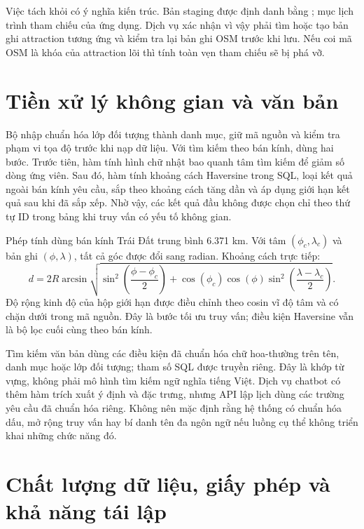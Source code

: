 Việc tách  khỏi  có ý nghĩa kiến trúc. Bản staging được định danh bằng ; mục lịch trình tham chiếu  của ứng dụng. Dịch vụ xác nhận vì vậy phải tìm hoặc tạo bản ghi attraction tương ứng và kiểm tra lại bản ghi OSM trước khi lưu. Nếu coi mã OSM là khóa của attraction lõi thì tính toàn vẹn tham chiếu sẽ bị phá vỡ.

\section{Tiền xử lý không gian và văn bản}

Bộ nhập chuẩn hóa lớp đối tượng thành danh mục, giữ mã nguồn và kiểm tra phạm vi tọa độ trước khi nạp dữ liệu. Với tìm kiếm theo bán kính,  dùng hai bước. Trước tiên, hàm tính hình chữ nhật bao quanh tâm tìm kiếm để giảm số dòng ứng viên. Sau đó, hàm tính khoảng cách Haversine trong SQL, loại kết quả ngoài bán kính yêu cầu, sắp theo khoảng cách tăng dần và áp dụng giới hạn kết quả sau khi đã sắp xếp. Nhờ vậy, các kết quả đầu không được chọn chỉ theo thứ tự ID trong bảng khi truy vấn có yếu tố không gian.

Phép tính dùng bán kính Trái Đất trung bình 6.371 km. Với tâm $(\phi_c,\lambda_c)$ và bản ghi $(\phi,\lambda)$, tất cả góc được đổi sang radian. Khoảng cách trực tiếp:
\begin{equation}
    d = 2R\arcsin\sqrt{
        \sin^2\left(\frac{\phi-\phi_c}{2}\right)
        + \cos(\phi_c)\cos(\phi)
          \sin^2\left(\frac{\lambda-\lambda_c}{2}\right)}.
\end{equation}
Độ rộng kinh độ của hộp giới hạn được điều chỉnh theo cosin vĩ độ tâm và có chặn dưới trong mã nguồn. Đây là bước tối ưu truy vấn; điều kiện Haversine vẫn là bộ lọc cuối cùng theo bán kính.

Tìm kiếm văn bản dùng các điều kiện  đã chuẩn hóa chữ hoa-thường trên tên, danh mục hoặc lớp đối tượng; tham số SQL được truyền riêng. Đây là khớp từ vựng, không phải mô hình tìm kiếm ngữ nghĩa tiếng Việt. Dịch vụ chatbot có thêm hàm trích xuất ý định và đặc trưng, nhưng API lập lịch dùng các trường yêu cầu đã chuẩn hóa riêng. Không nên mặc định rằng hệ thống có chuẩn hóa dấu, mở rộng truy vấn hay bí danh tên đa ngôn ngữ nếu luồng cụ thể không triển khai những chức năng đó.

\section{Chất lượng dữ liệu, giấy phép và khả năng tái lập}

